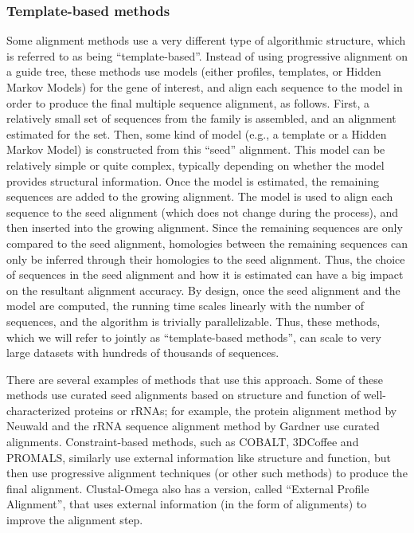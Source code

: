 \subsubsection{Template-based methods}
Some alignment methods use a very different type of
algorithmic structure, which is referred to as being ``template-based''. Instead of
using progressive alignment on a guide tree, these methods use models (either profiles,
templates, or Hidden Markov Models) for the gene of interest, and align each sequence to
the model in order to produce the final multiple sequence alignment, as follows. First, a
relatively small set of sequences from the family is assembled, and an alignment estimated
for the set. Then, some kind of model (e.g., a template or a Hidden Markov Model) is
constructed from this ``seed'' alignment. This model can be relatively simple or quite
complex, typically depending on whether the model provides structural information. Once
the model is estimated, the remaining sequences are added to the growing alignment. The
model is used to align each sequence to the seed alignment (which does not change during
the process), and then inserted into the growing alignment. Since the remaining sequences
are only compared to the seed alignment, homologies between the remaining sequences
can only be inferred through their homologies to the seed alignment. Thus, the choice
of sequences in the seed alignment and how it is estimated can have a big impact on
the resultant alignment accuracy. By design, once the seed alignment and the model
are computed, the running time scales linearly with the number of sequences, and the
algorithm is trivially parallelizable. Thus, these methods, which we will refer to jointly as
``template-based methods'', can scale to very large datasets with hundreds of thousands
of sequences.

There are several examples of methods that use this approach. Some of these methods use curated seed alignments based on
structure and function of well-characterized proteins or rRNAs; for example, the protein
alignment method by Neuwald and the rRNA sequence alignment method by Gardner 
use curated alignments. Constraint-based methods, such as COBALT,
3DCoffee and PROMALS, similarly use external information like structure and
function, but then use progressive alignment techniques (or other such methods) to 
produce the final alignment. Clustal-Omega also has a version, called ``External Profile
Alignment'', that uses external information (in the form of alignments) to improve the
alignment step.

